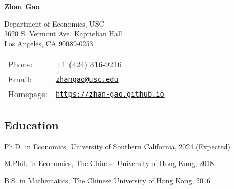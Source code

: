 \documentclass[letterpaper]{article}
\def\name{Zhan Gao}
\renewenvironment{itemize}{
  \begin{list}{}{
    \setlength{\leftmargin}{1.5em}
    \setlength{\itemsep}{0.25em}
    \setlength{\parskip}{0pt}
    \setlength{\parsep}{0.25em}
  }
}{
  \end{list}
}
\begin{document}
{\LARGE \bf \name}


\vspace{0.25in}

\begin{minipage}{0.45\linewidth}
  Department of Economics, USC\\
  3620 S. Vermont Ave. Kaprielian Hall\\
  Los Angeles, CA 90089-0253
\end{minipage}
\begin{minipage}{0.45\linewidth}
  \begin{tabular}{ll}
    Phone: & +1 (424) 316-9216 \\
    Email: & \href{mailto:zhangao@usc.edu}{\tt zhangao@usc.edu} \\
    Homepage: & \href{https://zhan-gao.github.io}{\tt https://zhan-gao.github.io}\\
  \end{tabular}
\end{minipage}




\subsection*{\bf Education}

\begin{itemize}
  \item {
    Ph.D. in Economics, University of Southern California, 2024 (Expected)
  }
  \item {
    M.Phil. in Economics, The Chinese University of Hong Kong, 2018
  }
  \item B.S. in Mathematics, The Chinese University of Hong Kong, 2016
\end{itemize}
\end{document}
